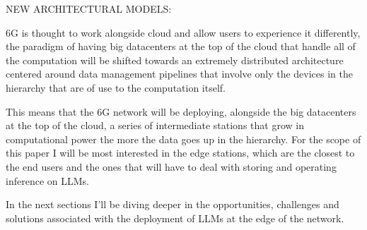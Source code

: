 \bigskip
\noindent
NEW ARCHITECTURAL MODELS:
\label{ssec:architectural-models}

6G is thought to work alongside cloud and allow users to experience it differently, the paradigm of
having big datacenters at the top of the cloud that handle all of the computation will be shifted
towards an extremely distributed architecture centered around data management pipelines that involve
only the devices in the hierarchy that are of use to the computation itself.

This means that the 6G network will be deploying, alongside the big datacenters at the top of the
cloud, a series of intermediate stations that grow in computational power the more the data goes up
in the hierarchy. For the scope of this paper I will be most interested in the edge stations, which
are the closest to the end users and the ones that will have to deal with storing and operating
inference on LLMs.

\medskip
In the next sections I’ll be diving deeper in the opportunities, challenges and solutions associated
with the deployment of LLMs at the edge of the network.
